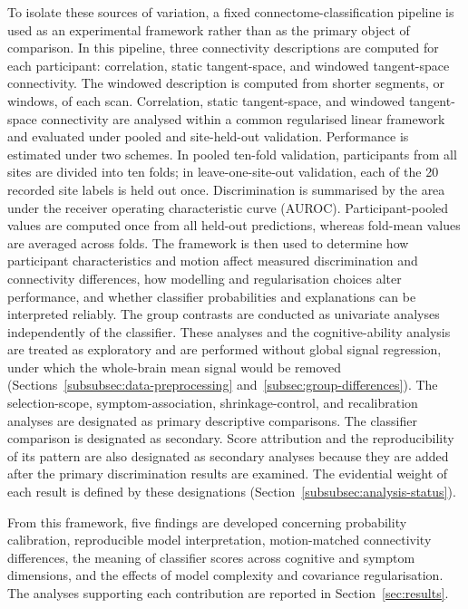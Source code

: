 To isolate these sources of variation, a fixed connectome-classification pipeline is used as an experimental framework rather than as the primary object of comparison. In this pipeline, three connectivity
descriptions are computed for each participant: correlation, static tangent-space, and
windowed tangent-space connectivity. The windowed description is computed from shorter
segments, or windows, of each scan. Correlation, static tangent-space, and windowed tangent-space connectivity are analysed within a common regularised linear framework and evaluated under pooled and site-held-out validation.  Performance is estimated under two schemes. In pooled ten-fold
validation, participants from all sites are divided into ten folds; in leave-one-site-out validation, each of the 20 recorded site labels is held out once. Discrimination is summarised by the area under the receiver operating characteristic curve (AUROC). Participant-pooled values are computed once from all held-out predictions, whereas fold-mean values are averaged across folds. The framework is then used to determine how participant characteristics and motion affect measured discrimination and connectivity differences, how modelling and regularisation choices alter performance, and whether classifier probabilities and explanations can be interpreted reliably. The group contrasts are conducted as univariate analyses independently of the classifier. These analyses and the cognitive-ability analysis are treated as exploratory and are performed without global signal regression, under which the whole-brain mean signal would be removed (Sections~\ref{subsubsec:data-preprocessing} and~\ref{subsec:group-differences}). The selection-scope, symptom-association, shrinkage-control, and recalibration analyses are designated as primary descriptive comparisons. The classifier comparison is designated as secondary. Score attribution and the reproducibility of its pattern are also designated as secondary analyses because they are added after the primary discrimination results are examined. The evidential weight of each result is defined by these designations (Section~\ref{subsubsec:analysis-status}).

From this framework, five findings are developed concerning probability calibration, reproducible model interpretation, motion-matched connectivity differences, the meaning of classifier scores across cognitive and symptom dimensions, and the effects of model complexity and covariance regularisation. The analyses supporting each contribution are reported in Section~\ref{sec:results}.

